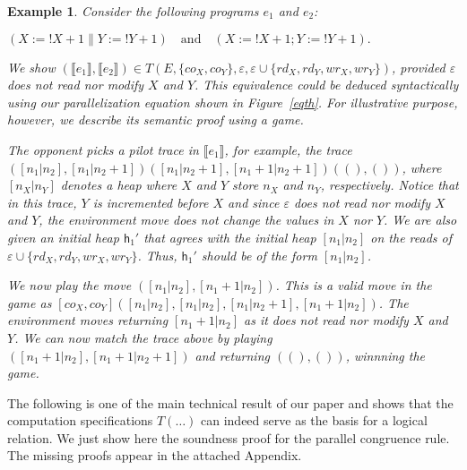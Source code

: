 \documentclass[nocopyrightspace,preprint]{sigplanconf}
\newcommand{\keywd}[1]{\mathtt{#1}}
\newcommand{\myread}[1]{!{#1}}
\newcommand{\unitval}{\keywd{()}}
\newcommand{\assign}[2]{{#1}:={#2}}
\newcommand{\mypar}[2]{#1 \| #2}
\newcommand{\eff}{\varepsilon}
\newcommand{\sem}[1]{\ensuremath{\llbracket {#1} \rrbracket}}
\newcommand{\rEff}[1]{\ensuremath{\mathit{rd}_{#1}}}
\newcommand{\cEff}[1]{\ensuremath{\mathit{co}_{#1}}}
\newcommand{\wEff}[1]{\ensuremath{\mathit{wr}_{#1}}}
\newtheorem{example}[theorem]{Example}
\newcommand{\cloc}{\ensuremath{X}\xspace}
\newcommand\heap{\ensuremath{\mathsf{h}}\xspace}
\newcommand\h{\heap}
\begin{document}
\begin{example}
\label{ex:parallel}
\normalfont
  Consider the following programs $e_1$ and $e_2$:

   \(
 (\mypar{\assign{\cloc}{\myread{\cloc} + 1}}{\assign{Y}{\myread{Y} + 1}})   \quad \textrm{and} \quad  (\assign{\cloc}{\myread{\cloc} + 1}; \assign{Y}{\myread{Y}+ 1}). 
 \)

\noindent
We show $(\sem{e_1},\sem{e_2}) \in T(E, \{\cEff{X},\cEff{Y}\}, \eff, \eff \cup \{\rEff{X},\rEff{Y},\wEff{X},\wEff{Y}\})$, provided $\eff$ does not read nor modify $X$ and $Y$. This equivalence could be deduced syntactically using our parallelization equation shown in Figure~\ref{eqth}. For illustrative purpose, however, we describe its semantic proof using a game. 

The opponent picks a pilot trace in $\sem{e_1}$, for example, the trace $([n_1|n_2],[n_1|n_2+1])([n_1|n_2+1],[n_1+1|n_2+1]) (\unitval,\unitval)$, where $[n_X|n_Y]$ denotes a heap where $X$ and $Y$ store $n_X$ and $n_Y$, respectively. Notice that in this trace, $Y$ is incremented before $X$ and since $\eff$ does not read nor modify $X$ and $Y$, the environment move does not change the values in $X$ nor $Y$. We are also given an initial heap  $\h_1'$ that agrees with the initial heap $[n_1|n_2]$ on the reads of $\eff \cup \{\rEff{X},\rEff{Y},\wEff{X},\wEff{Y}\}$. Thus, $\h_1'$ should be of the form $[n_1|n_2]$. 

We now play the move $([n_1|n_2], [n_1+1|n_2])$. This is a valid move in the game as $[\cEff{X},\cEff{Y}]([n_1|n_2],[n_1|n_2],[n_1|n_2+1],[n_1+1|n_2])$. The environment moves returning $[n_1+1|n_2]$ as it does not read nor modify $X$ and $Y$. We can now match the trace above by playing $([n_1+1|n_2],[n_1+1|n_2+1])$ and returning $(\unitval,\unitval)$, winnning the game.
\end{example}
The following is one of the main technical result of our paper and shows that
the computation specifications $T(\dots)$ can indeed serve as the
basis for a logical relation. We just show here the soundness proof for the parallel congruence rule. The missing proofs appear in the attached Appendix.
\end{document}
